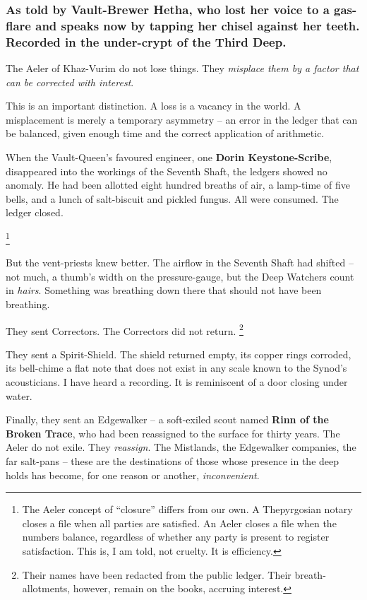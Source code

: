 \documentclass[12pt]{article}
\begin{document}
\subsubsection{As told by Vault-Brewer Hetha, who lost her voice to a gas-flare and speaks now by tapping her chisel against her teeth. Recorded in the under-crypt of the Third Deep.}

The Aeler of Khaz-Vurim do not lose things. They \textit{misplace them by a factor that can be corrected with interest}.

This is an important distinction. A loss is a vacancy in the world. A misplacement is merely a temporary asymmetry -- an error in the ledger that can be balanced, given enough time and the correct application of arithmetic.

When the Vault-Queen's favoured engineer, one \textbf{Dorin Keystone-Scribe}, disappeared into the workings of the Seventh Shaft, the ledgers showed no anomaly. He had been allotted eight hundred breaths of air, a lamp-time of five bells, and a lunch of salt-biscuit and pickled fungus. All were consumed. The ledger closed.

\footnote{The Aeler concept of ``closure'' differs from our own. A Thepyrgosian notary closes a file when all parties are satisfied. An Aeler closes a file when the numbers balance, regardless of whether any party is present to register satisfaction. This is, I am told, not cruelty. It is efficiency.}

But the vent-priests knew better. The airflow in the Seventh Shaft had shifted -- not much, a thumb's width on the pressure-gauge, but the Deep Watchers count in \textit{hairs}. Something was breathing down there that should not have been breathing.

They sent Correctors. The Correctors did not return. \footnote{Their names have been redacted from the public ledger. Their breath-allotments, however, remain on the books, accruing interest.}

They sent a Spirit-Shield. The shield returned empty, its copper rings corroded, its bell-chime a flat note that does not exist in any scale known to the Synod's acousticians. I have heard a recording. It is reminiscent of a door closing under water.

Finally, they sent an Edgewalker -- a soft-exiled scout named \textbf{Rinn of the Broken Trace}, who had been reassigned to the surface for thirty years. The Aeler do not exile. They \textit{reassign}. The Mistlands, the Edgewalker companies, the far salt-pans -- these are the destinations of those whose presence in the deep holds has become, for one reason or another, \textit{inconvenient}.
\end{document}
